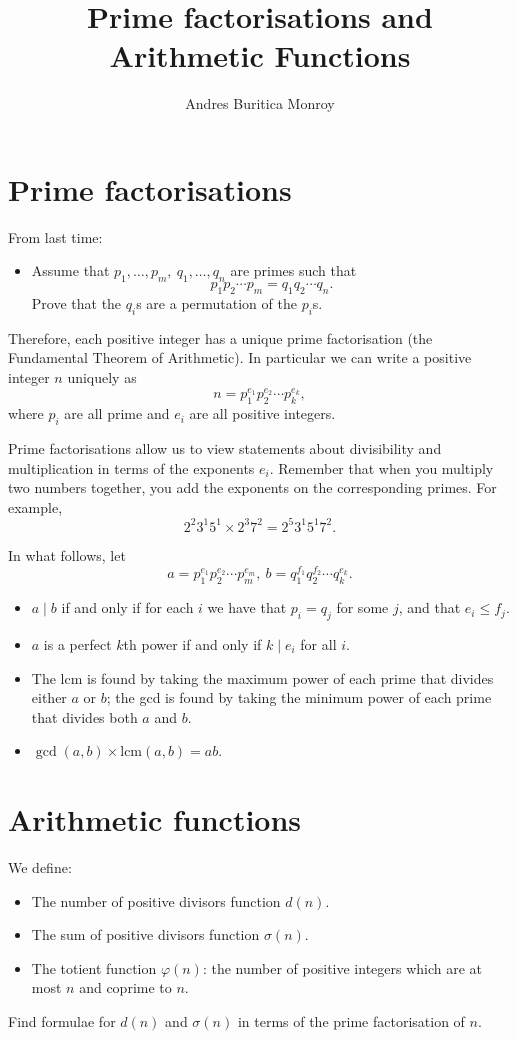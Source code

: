 \documentclass{article}
\title{Prime factorisations and Arithmetic Functions}
\author{Andres Buritica Monroy}
\date{}
\newcommand\lcm{\text{lcm}}
\begin{document}
\maketitle
\section{Prime factorisations}
From last time:
\begin{itemize}
	\item Assume that $p_1,\ldots,p_m,\ q_1,\ldots,q_n$ are primes such that
	      \[p_1p_2\cdots p_m=q_1q_2\cdots q_n.\]
	      Prove that the $q_i$s are a permutation of the $p_i$s.
\end{itemize}
Therefore, each positive integer has a unique prime factorisation (the
Fundamental Theorem of Arithmetic).
In particular we can write a positive integer $n$ uniquely as
\[n=p_1^{e_1}p_2^{e_2}\cdots p_k^{e_k},\]
where $p_i$ are all prime and $e_i$ are all positive integers.

Prime factorisations allow us to view statements about divisibility and
multiplication in terms of the exponents $e_i$. Remember that when you
multiply two numbers together, you add the exponents on the corresponding
primes. For example,
\[2^2 3^1 5^1\times 2^3 7^2=2^5 3^1 5^1 7^2.\]

In what follows, let
\[a=p_1^{e_1}p_2^{e_2}\cdots p_m^{e_m},\
	b=q_1^{f_1}q_2^{f_2}\cdots q_k^{e_k}.\]
\begin{itemize}
	\item $a\mid b$ if and only if for each $i$ we have that $p_i=q_j$
	      for some $j$, and that $e_i\le f_j$.
	\item $a$ is a perfect $k$th power if and only if $k\mid e_i$ for all $i$.
	\item The lcm is found by taking the maximum power of each prime that
	      divides either $a$ or $b$; the gcd is found by taking the minimum power of
	      each prime that divides both $a$ and $b$.
	\item $\gcd(a,b)\times\lcm(a,b)=ab$.
\end{itemize}
\section{Arithmetic functions}
We define:
\begin{itemize}
	\item The number of positive divisors function $d(n)$.
	\item The sum of positive divisors function $\sigma(n)$.
	\item The totient function $\varphi(n)$: the number of positive integers
	      which are at most $n$ and coprime to $n$.
\end{itemize}
Find formulae for $d(n)$ and $\sigma(n)$ in terms of the prime factorisation
of $n$.
\end{document}
